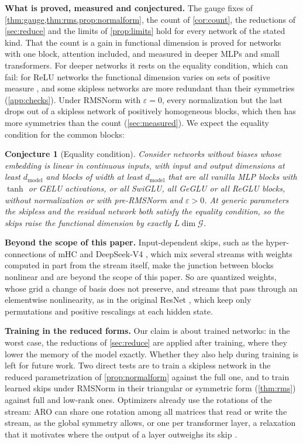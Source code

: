 \documentclass[10pt]{article}
\newtheorem{conjecture}{Conjecture}
\theoremstyle{definition}
\theoremstyle{remark}
\newcommand{\dm}{d_{\mathrm{model}}}
\newcommand{\G}{\mathcal{G}}
\newcommand{\para}[1]{\smallskip\noindent\textbf{#1}\hspace{0.5em}}
\begin{document}
\para{What is proved, measured and conjectured.} The gauge fixes of \cref{thm:gauge,thm:rms,prop:normalform}, the count of \cref{cor:count}, the reductions of \cref{sec:reduce} and the limits of \cref{prop:limits} hold for every network of the stated kind. That the count is a gain in functional dimension is proved for networks with one block, attention included, and measured in deeper MLPs and small transformers. For deeper networks it rests on the equality condition, which can fail: for ReLU networks the functional dimension varies on sets of positive measure \citep{grigsby2023hidden}, and some skipless networks are more redundant than their symmetries (\cref{app:checks}). Under RMSNorm with $\varepsilon = 0$, every normalization but the last drops out of a skipless network of positively homogeneous blocks, which then has more symmetries than the count (\cref{sec:measured}). We expect the equality condition for the common blocks:

\begin{conjecture}[Equality condition]\label{conj:equality}
Consider networks without biases whose embedding is linear in continuous inputs, with input and output dimensions at least $\dm$ and blocks of width at least $\dm$ that are all vanilla MLP blocks with $\tanh$ or GELU activations, or all SwiGLU, all GeGLU or all ReGLU blocks, without normalization or with pre-RMSNorm and $\varepsilon > 0$. At generic parameters the skipless and the residual network both satisfy the equality condition, so the skips raise the functional dimension by exactly $L\dim\G$.
\end{conjecture}

\para{Beyond the scope of this paper.} Input-dependent skips, such as the hyper-connections of mHC \citep{xie2025mhc} and DeepSeek-V4 \citep{deepseek2026v4}, which mix several streams with weights computed in part from the stream itself, make the junction between blocks nonlinear and are beyond the scope of this paper. So are quantized weights, whose grid a change of basis does not preserve, and streams that pass through an elementwise nonlinearity, as in the original ResNet \citep{he2016resnet}, which keep only permutations and positive rescalings at each hidden state.

\para{Training in the reduced forms.} Our claim is about trained networks: in the worst case, the reductions of \cref{sec:reduce} are applied after training, where they lower the memory of the model exactly. Whether they also help during training is left for future work. Two direct tests are to train a skipless network in the reduced parametrization of \cref{prop:normalform} against the full one, and to train learned skips under RMSNorm in their triangular or symmetric form (\cref{thm:rms}) against full and low-rank ones. Optimizers already use the rotations of the stream: ARO can share one rotation among all matrices that read or write the stream, as the global symmetry allows, or one per transformer layer, a relaxation that it motivates where the output of a layer outweighs its skip \citep[Sections~6.4 and~6.5]{gong2026aro}.
\end{document}
